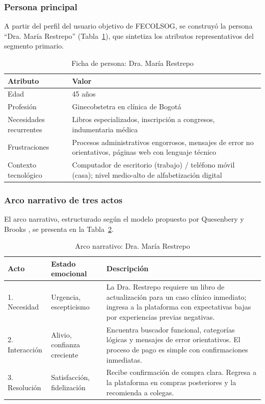 \documentclass[conference]{IEEEtran}
\begin{document}
\subsubsection{Persona principal}

A partir del perfil del usuario objetivo de FECOLSOG, se construyó la persona ``Dra. María Restrepo'' (Tabla~\ref{tab:persona}), que sintetiza los atributos representativos del segmento primario.

\begin{table}[H]
\centering
\caption{Ficha de persona: Dra. María Restrepo}
\label{tab:persona}
\setlength{\tabcolsep}{3pt}
\renewcommand{\arraystretch}{1.2}
\begin{tabular}{|p{2cm}|p{5.5cm}|}
\hline
\textbf{Atributo} & \textbf{Valor} \\
\hline
Edad & 45 años \\
\hline
Profesión & Ginecobstetra en clínica de Bogotá \\
\hline
Necesidades recurrentes & Libros especializados, inscripción a congresos, indumentaria médica \\
\hline
Frustraciones & Procesos administrativos engorrosos, mensajes de error no orientativos, páginas web con lenguaje técnico \\
\hline
Contexto tecnológico & Computador de escritorio (trabajo) / teléfono móvil (casa); nivel medio-alto de alfabetización digital \\
\hline
\end{tabular}
\end{table}

\subsubsection{Arco narrativo de tres actos}

El arco narrativo, estructurado según el modelo propuesto por Quesenbery y Brooks \cite{storytelling-ux}, se presenta en la Tabla~\ref{tab:arco}.

\begin{table}[H]
\centering
\caption{Arco narrativo: Dra. María Restrepo}
\label{tab:arco}
\setlength{\tabcolsep}{3pt}
\renewcommand{\arraystretch}{1.2}
\begin{tabular}{|p{1.5cm}|p{1.8cm}|p{4cm}|}
\hline
\textbf{Acto} & \textbf{Estado emocional} & \textbf{Descripción} \\
\hline
1. Necesidad & Urgencia, escepticismo & La Dra. Restrepo requiere un libro de actualización para un caso clínico inmediato; ingresa a la plataforma con expectativas bajas por experiencias previas negativas. \\
\hline
2. Interacción & Alivio, confianza creciente & Encuentra buscador funcional, categorías lógicas y mensajes de error orientativos. El proceso de pago es simple con confirmaciones inmediatas. \\
\hline
3. Resolución & Satisfacción, fidelización & Recibe confirmación de compra clara. Regresa a la plataforma en compras posteriores y la recomienda a colegas. \\
\hline
\end{tabular}
\end{table}
\end{document}

